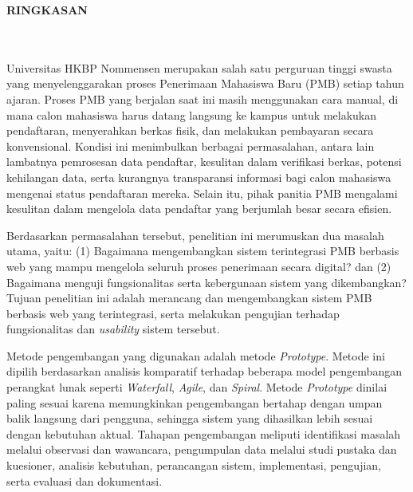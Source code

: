 \clearpage
{}%
\thispagestyle{fancy}

\begin{center}
	\large \bfseries \MakeUppercase{Ringkasan}\\
	\normalsize \normalfont {\thetitle}\\
	\normalsize \normalfont {\theauthor}\\
	\bigskip
	
	\normalsize \normalfont \justifying
	Universitas HKBP Nommensen merupakan salah satu perguruan tinggi swasta yang menyelenggarakan proses Penerimaan Mahasiswa Baru (PMB) setiap tahun ajaran. Proses PMB yang berjalan saat ini masih menggunakan cara manual, di mana calon mahasiswa harus datang langsung ke kampus untuk melakukan pendaftaran, menyerahkan berkas fisik, dan melakukan pembayaran secara konvensional. Kondisi ini menimbulkan berbagai permasalahan, antara lain lambatnya pemrosesan data pendaftar, kesulitan dalam verifikasi berkas, potensi kehilangan data, serta kurangnya transparansi informasi bagi calon mahasiswa mengenai status pendaftaran mereka. Selain itu, pihak panitia PMB mengalami kesulitan dalam mengelola data pendaftar yang berjumlah besar secara efisien.\par

	Berdasarkan permasalahan tersebut, penelitian ini merumuskan dua masalah utama, yaitu: (1) Bagaimana mengembangkan sistem terintegrasi PMB berbasis web yang mampu mengelola seluruh proses penerimaan secara digital? dan (2) Bagaimana menguji fungsionalitas serta kebergunaan sistem yang dikembangkan? Tujuan penelitian ini adalah merancang dan mengembangkan sistem PMB berbasis web yang terintegrasi, serta melakukan pengujian terhadap fungsionalitas dan \textit{usability} sistem tersebut.\par

	Metode pengembangan yang digunakan adalah metode \textit{Prototype}. Metode ini dipilih berdasarkan analisis komparatif terhadap beberapa model pengembangan perangkat lunak seperti \textit{Waterfall}, \textit{Agile}, dan \textit{Spiral}. Metode \textit{Prototype} dinilai paling sesuai karena memungkinkan pengembangan bertahap dengan umpan balik langsung dari pengguna, sehingga sistem yang dihasilkan lebih sesuai dengan kebutuhan aktual. Tahapan pengembangan meliputi identifikasi masalah melalui observasi dan wawancara, pengumpulan data melalui studi pustaka dan kuesioner, analisis kebutuhan, perancangan sistem, implementasi, pengujian, serta evaluasi dan dokumentasi.\par


\end{center}
